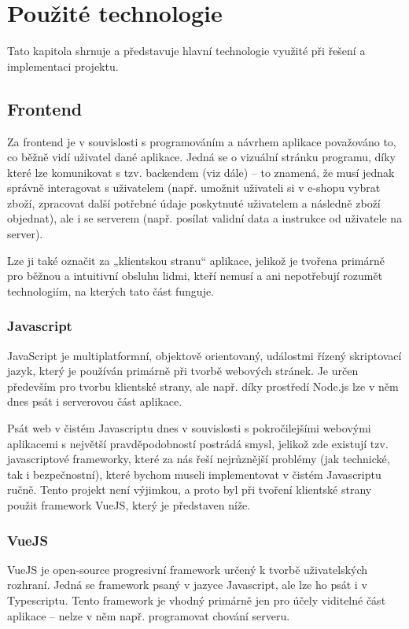 \chapter{Použité technologie}
Tato kapitola shrnuje a představuje hlavní technologie využité při řešení a implementaci projektu.

\section{Frontend}
Za frontend je v souvislosti s programováním a návrhem aplikace považováno to, co běžně vidí uživatel dané aplikace. Jedná se o vizuální stránku programu, díky které lze komunikovat s tzv. backendem (viz dále) – to znamená, že musí jednak správně interagovat s uživatelem (např. umožnit uživateli si v e-shopu vybrat zboží, zpracovat další potřebné údaje poskytnuté uživatelem a následně zboží objednat), ale i se serverem (např. posílat validní data a instrukce od uživatele na server).

Lze ji také označit za „klientskou stranu“ aplikace, jelikož je tvořena primárně pro běžnou a intuitivní obsluhu lidmi, kteří nemusí a ani nepotřebují rozumět technologiím, na kterých tato část funguje. \cite{FEvsBE}

	\subsection{Javascript}
	JavaScript je multiplatformní, objektově orientovaný, událostmi řízený skriptovací jazyk, který je používán primárně při tvorbě webových stránek. Je určen především pro tvorbu klientské strany, ale např. díky prostředí Node.js lze v něm dnes psát i serverovou část aplikace. \cite{JS1} \cite{JS2}
	
	Psát web v čistém Javascriptu dnes v souvislosti s pokročilejšími webovými aplikacemi s největší pravděpodobností postrádá smysl, jelikož zde existují tzv. javascriptové frameworky, které za nás řeší nejrůznější problémy (jak technické, tak i bezpečnostní), které bychom museli implementovat v čistém Javascriptu ručně. Tento projekt není výjimkou, a proto byl při tvoření klientské strany použit framework VueJS, který je představen níže.
	
	\subsection{VueJS}
	VueJS je open-source progresivní framework určený k tvorbě uživatelských rozhraní. Jedná se framework psaný v jazyce Javascript, ale lze ho psát i v Typescriptu. Tento framework je vhodný primárně jen pro účely viditelné část aplikace – nelze v něm např. programovat chování serveru. \cite{VueJS1}
	
